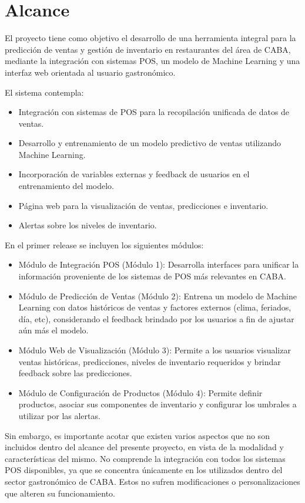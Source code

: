 \section{Alcance}

El proyecto tiene como objetivo el desarrollo de una herramienta integral para la predicción de ventas y gestión de inventario en restaurantes del área de CABA, mediante la integración con sistemas POS, un modelo de Machine Learning y una interfaz web orientada al usuario gastronómico. 

El sistema contempla: 

\begin{itemize}
    \item Integración con sistemas de POS para la recopilación unificada de datos de ventas. 
    \item Desarrollo y entrenamiento de un modelo predictivo de ventas utilizando Machine Learning. 
    \item Incorporación de variables externas y feedback de usuarios en el entrenamiento del modelo. 
    \item Página web para la visualización de ventas, predicciones e inventario. 
    \item Alertas sobre los niveles de inventario. 
\end{itemize}

En el primer release se incluyen los siguientes módulos: 

\begin{itemize}
    \item Módulo de Integración POS (Módulo 1): Desarrolla interfaces para unificar la información proveniente de los sistemas de POS más relevantes en CABA. 
    \item Módulo de Predicción de Ventas (Módulo 2): Entrena un modelo de Machine Learning con datos históricos de ventas y factores externos (clima, feriados, día, etc), considerando el feedback brindado por los usuarios a fin de ajustar aún más el modelo. 
    \item Módulo Web de Visualización (Módulo 3): Permite a los usuarios visualizar ventas históricas, predicciones, niveles de inventario requeridos y brindar feedback sobre las predicciones. 
    \item Módulo de Configuración de Productos (Módulo 4): Permite definir productos, asociar sus componentes de inventario y configurar los umbrales a utilizar por las alertas.
\end{itemize}

Sin embargo, es importante acotar que existen varios aspectos que no son incluidos dentro del alcance del presente proyecto, en vista de la modalidad y características del mismo. No comprende la integración con todos los sistemas POS disponibles, ya que se concentra únicamente en los utilizados dentro del sector gastronómico de CABA. Estos no sufren modificaciones o personalizaciones que alteren su funcionamiento.

